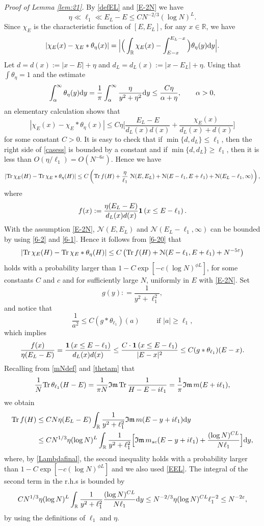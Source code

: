 \documentclass[draft]{article}
\newcommand{\e}{\varepsilon}
\newcommand{\rd}{{\rm d}}
\newcommand{\tr}{\mbox{Tr\,}}
\newcommand{\al}{\alpha}
\newcommand{\be}{\begin{equation}}
\newcommand{\ee}{\end{equation}}
\newcommand{\cN}{{\mathcal N}}
\newcommand{\im}{{\mathfrak{Im} \, }}
\newcommand{\R}{{\mathbb R }}
\numberwithin{equation}{section}
\numberwithin{theorem}{section}
\numberwithin{definition}{section}
\numberwithin{remark}{section}
\begin{document}
\noindent 
{\it Proof of Lemma \ref{lem:21}.}  By \eqref{defEL} and \eqref{E-2N} we have 
\be
   \eta\ll \ell_1\ll E_L-E\le CN^{-2/3}(\log N)^L.
\label{EEL}
\ee
Since $\chi_E$ is the characteristic function of  $ [E, E_L]$, 
for any $x\in \R$, we have  
\[
|\chi_E(x) - \chi_E  \ast \theta_\eta (x)| 
=  \Big |  \Big (\int_\R  \chi_E(x) - \int_{E-x}^{E_L-x} \Big )   
\theta_\eta(y)\rd y  \Big | .
\]
Let  $d =d(x):= |x-E| +\eta$ and $d_L=d_L(x) := |x-E_L| +\eta$. Using that $\int \theta_\eta =1$ and
the estimate
$$
   \int_\al^\infty \theta_\eta(y)\rd y = \frac{1}{\pi}\int_\al^\infty 
\frac { \eta} {  y^2 + \eta^2} \rd y 
  \le \frac{C\eta}{\al + \eta}, \qquad \al>0,
$$
an elementary calculation shows that
\be\label{casess}
|\chi_E(x) - \chi_E  \ast \theta_\eta (x)|  \le  C\eta\Big[
\frac {E_L-E} {d_L(x) d(x)} + \frac {\chi_E(x)}{d_L(x)+ d(x)}\Big] 
\ee
for some constant $C>0$. It is easy to check that if $\min\{d, d_L\}\leq \ell_1$, then 
the right side of \eqref{casess} is bounded by a constant and  if $\min\{d, d_L\}\geq \ell_1$,
 then it is less than $O(\eta/\ell_1)=O(N^{-6\e})$. 
Hence  we have 
\be\label{6-20} |\tr \chi_E(H) - \tr \chi_E  \ast \theta_\eta (H)| 
 \le C\left( \tr f(H)  + \frac {\eta}{\ell_1}\,\,\cN (E, E_L)
 +   \cN (E-\ell_1, E+\ell_1) +  \cN (E_L-\ell_1, \infty) \right),
\ee
where
\be
f(x) := \frac {\eta (E_L-E)} {d_L(x) d(x)} {\bf 1}\left(x\leq E-\ell_1\right).
\ee
With the assumption \eqref{E-2N}, $\cN (E, E_L)$ and $\cN (E_L-\ell_1, \infty)$ 
can be bounded by using \eqref{6-2} and \eqref{6-1}. Hence it follows from \eqref{6-20} that 
\be\label{6-22} |\tr \chi_E(H) - \tr  \chi_E  \ast \theta_\eta (H)|  \le C\left( \tr f(H)   
 +   \cN (E-\ell_1, E+\ell_1) +N^{- 5\e}  \right)
\ee
holds with a probability larger than   $1-C \exp[-c(\log N)^{\phi L}]$, 
for some constants $C$ and $c$ and for sufficiently large $N$, uniformly in $E$ with \eqref{E-2N}.
Set
\be
g(y): = \frac 1 { y^2 + \ell_1^2},
\ee
and notice that
\be
  \frac{1}{a^2} \le C (g  \ast \theta_{\ell_1}) (a)     \qquad \mbox{ if }    |a| \ge \ell_1,
\ee 
which implies 
\be
\frac{f(x)}{\eta(E_L-E) } =\frac{  {\bf 1}\left(x\leq E-\ell_1\right)}{d_L(x)d(x)}
  \le \frac{C\cdot {\bf 1}\left(x\leq E-\ell_1\right)}{|E-x|^2} \le
C  (g  \ast \theta_{\ell_1}) (E - x).  
 \ee
Recalling from \eqref{mNdef} and \eqref{thetam}
 that
$$  
\frac{1}{N}\tr \theta_{\ell_1}(H-E) = \frac{1}{\pi N} \im \tr \frac{1}{H-E-i\ell_1}=
\frac{1}{\pi}\im m(E+i\ell_1),
$$
we obtain
\begin{align}\nonumber
\tr f(H)  & \le CN  \eta(E_L-E)   \int_\R  \frac 1 {y^2 + \ell_1^2 }    \im  m( E-y+i\ell_1)  \rd y  
   \\\label{6-27}
&  \le CN^{1/3}  \eta (\log N)^L \int_\R  \frac 1 {y^2 + \ell_1^2 }  \Big[
 \im m_{sc}( E-y+i\ell_1) +  \frac {(\log N)^{CL}} { N \ell_1} \Big] \rd y,    
\end{align}
where, by \eqref{Lambdafinal},  the second inequality holds with a probability larger
 than  $1-C \exp[-c(\log N)^{\phi L}]$ and we also used \eqref{EEL}.
The integral of the second term in the r.h.s is bounded by 
\be\label{6-28}
CN^{1/3}\eta(\log N)^L\int_\R  \frac 1 {y^2 + \ell_1^2 }  \frac {(\log N)^{CL}} { N \ell_1}  \rd y 
\le N^{-2/3}\eta (\log N)^{CL}\ell_1^{-2}\leq N^{-2\e},
\ee
by using  the definitions of $\ell_1$ and $\eta$.
\end{document}
